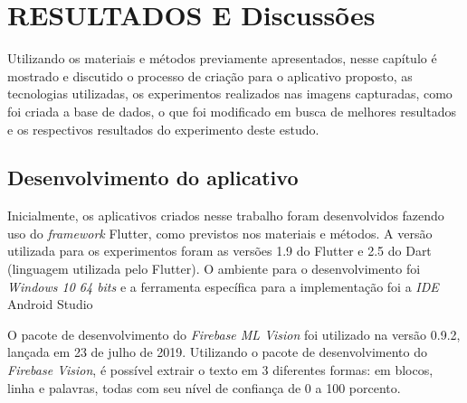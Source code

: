 \chapter{RESULTADOS E Discussões}\label{ch:intro}

Utilizando os materiais e métodos previamente apresentados, nesse capítulo é mostrado e discutido o processo de criação para o aplicativo proposto, as tecnologias utilizadas, os experimentos realizados nas imagens capturadas, como foi criada a base de dados, o que foi modificado em busca de melhores resultados e os respectivos resultados do experimento deste estudo.


\section{Desenvolvimento do aplicativo}
Inicialmente, os aplicativos criados nesse trabalho foram desenvolvidos fazendo uso do \textit{framework} Flutter, como previstos nos materiais e métodos. A versão utilizada para os experimentos foram as versões 1.9 do Flutter e 2.5 do Dart (linguagem utilizada pelo Flutter). O ambiente para o desenvolvimento foi \textit{Windows 10 64 bits} e a ferramenta específica para a implementação foi a \textit{IDE} Android Studio %


O pacote de desenvolvimento do \textit{Firebase ML Vision} foi utilizado na versão 0.9.2, lançada em 23 de julho de 2019.	Utilizando o pacote de desenvolvimento do \textit{Firebase Vision}, é possível extrair o texto em 3 diferentes formas: em blocos, linha e palavras, todas com seu nível de confiança de 0 a 100 porcento. %
 
